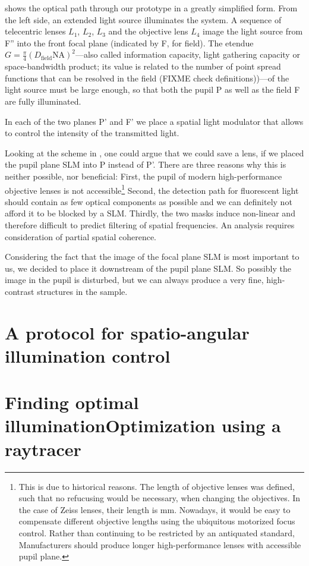  shows the optical path through our prototype
in a greatly simplified form.  From the left side, an extended light
source illuminates the system. A sequence of telecentric lenses $L_1$,
$L_2$, $L_3$ and the objective lens $L_4$ image the light source from
F'' into the front focal plane (indicated by F, for field). The
etendue $G=\frac{\pi}{4}(D_\textrm{field}\textrm{NA})^2$---also called
information capacity, light gathering capacity or space-bandwidth
product; its value is related to the number of point spread functions
that can be resolved in the field (FIXME check definitions))---of the
light source must be large enough, so that both the pupil P as well as
the field F are fully illuminated.

In each of the two planes P' and F' we place a spatial light modulator
that allows to control the intensity of the transmitted light.

Looking at the scheme in , one could argue
that we could save a lens, if we placed the pupil plane SLM into P
instead of P'. There are three reasons why this is neither possible,
nor beneficial: First, the pupil of modern high-performance objective
lenses is not accessible\footnote{This is due to historical reasons.
  The length of objective lenses was defined, such that no refucusing
  would be necessary, when changing the objectives. In the case of
  Zeiss lenses, their length is \unit[45]{mm}. Nowadays, it would be
  easy to compensate different objective lengths using the ubiquitous
  motorized focus control.  Rather than continuing to be restricted by
  an antiquated standard, Manufacturers should produce longer
  high-performance lenses with accessible pupil plane.}  Second, the
detection path for fluorescent light should contain as few optical
components as possible and we can definitely not afford it to be
blocked by a SLM.  Thirdly, the two masks induce non-linear and
therefore difficult to predict filtering of spatial frequencies. An
analysis requires consideration of partial spatial coherence.

Considering the fact that the image of the focal plane SLM is most
important to us, we decided to place it downstream of the pupil plane
SLM. So possibly the image in the pupil is disturbed, but we can
always produce a very fine, high-contrast structures in the sample.

\section{A protocol for spatio-angular illumination control}
\section{Finding optimal illuminationOptimization using a raytracer}

